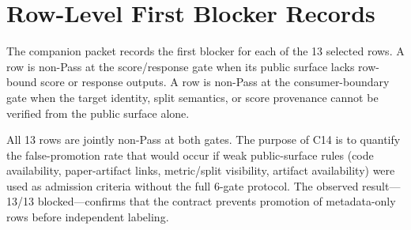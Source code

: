 \documentclass{IEEEtran}
\begin{document}
\section{Row-Level First Blocker Records}

The companion packet records the first blocker for each of the 13 selected
rows. A row is non-Pass at the score/response gate when its public surface
lacks row-bound score or response outputs. A row is non-Pass at the
consumer-boundary gate when the target identity, split semantics, or
score provenance cannot be verified from the public surface alone.

All 13 rows are jointly non-Pass at both gates. The purpose of C14 is to
quantify the false-promotion rate that would occur if weak public-surface
rules (code availability, paper-artifact links, metric/split visibility,
artifact availability) were used as admission criteria without the full
6-gate protocol. The observed result---13/13 blocked---confirms that the
contract prevents promotion of metadata-only rows before independent
labeling.
\end{document}
